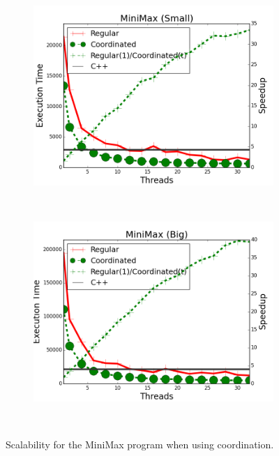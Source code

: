 \begin{figure}[]
        \centering
        \begin{subfigure}[b]{\plotsize\textwidth}
           \includegraphics[width=\textwidth]{experiments/coordination/cmp-min-max-tictactoe-small.png}
           \label{fig:coordination:coord_minimax_small}
        \end{subfigure}
        ~
        \begin{subfigure}[b]{\plotsize\textwidth}
           \includegraphics[width=\textwidth]{experiments/coordination/cmp-min-max-tictactoe-big.png}
           \label{fig:coordination:coord_minimax_big}
        \end{subfigure} \\

        \caption{Scalability for the MiniMax program when using coordination.}

        \label{fig:coordination:results_minmax}
\end{figure}




